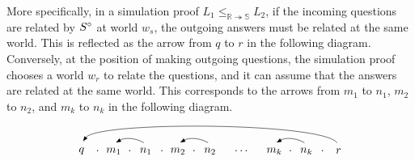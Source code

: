 More specifically, in a simulation proof $L_1 \le_{\mathbb{R} \twoheadrightarrow
\mathbb{S}} L_2$, if the incoming questions are related by $S^\circ$ at world
$w_s$, the outgoing answers must be related at the same world. This is reflected
as the arrow from $q$ to $r$ in the following diagram. Conversely, at the
position of making outgoing questions, the simulation proof chooses a world
$w_r$ to relate the questions, and it can assume that the answers are related at
the same world. This corresponds to the arrows from $m_1$ to $n_1$, $m_2$ to
$n_2$, and $m_k$ to $n_k$ in the following diagram.
\[
  \begin{tikzpicture}[baseline=(current bounding box.center)]
    \node (q) at (0,0) {$q$};
    \node at (0.5,0) {$\cdot$};
    \node (m1) at (1,0) {$m_1$};
    \node at (1.5,0) {$\cdot$};
    \node (n1) at (2,0) {$n_1$};
    \node at (2.5,0) {$\cdot$};
    \node (m2) at (3,0) {$m_2$};
    \node at (3.5,0) {$\cdot$};
    \node (n2) at (4,0) {$n_2$};
    \node (dots) at (5,0) {$\cdots$};
    \node (mk) at (6,0) {$m_k$};
    \node at (6.5,0) {$\cdot$};
    \node (nk) at (7,0) {$n_k$};
    \node at (7.5,0) {$\cdot$};
    \node (r) at (8,0) {$r$};

    \draw[{Latex}-, shorten <=2pt, shorten >=2pt] (q.north).. controls +(0.5cm, 0.7cm) and +(-0.5cm, 0.7cm) .. (r.north);
    \draw[{Latex}-, bend left=30, shorten <=2pt, shorten >=2pt] (m1.north) to (n1.north);
    \draw[{Latex}-, bend left=30, shorten <=2pt, shorten >=2pt] (m2.north) to (n2.north);
    \draw[{Latex}-, bend left=30, shorten <=2pt, shorten >=2pt] (mk.north) to (nk.north);
  \end{tikzpicture}
\]

